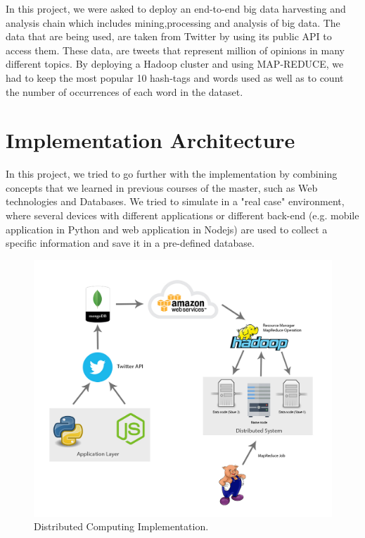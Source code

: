 \documentclass{article}
\newcommand*\setcaptioncitation[1]{\def\captioncitation{\textit{Source:}~#1}}
\let\captioncitation\relax
\begin{document}
        In this project, we were asked to deploy an end-to-end big data harvesting and analysis chain which includes mining,processing and analysis of big data. The data that are being used, are taken from Twitter by using its public API to access them. These data, are tweets that represent million of opinions in many different topics. By deploying a Hadoop cluster and using MAP-REDUCE, we had to keep the most popular 10 hash-tags and words used as well as to count the number of occurrences of each word in the dataset. 
         
        \newpage         
        \section{Implementation Architecture}
        In this project, we tried to go further with the implementation by combining concepts that we learned in previous courses of the master, such as Web technologies and Databases.  
        We tried to simulate in a "real case" environment, where several devices with different applications or different back-end (e.g. mobile application in Python and web application in Nodejs) are used to collect a specific information and save it in a pre-defined database.

        \begin{figure}[H]
            \centering 
            \includegraphics[width=1\linewidth]{./img/architecture.jpg}
            \setcaptioncitation{self-made}
            \caption{Distributed Computing Implementation.}
            \label{fig:architecture}
        \end{figure}
\end{document}
